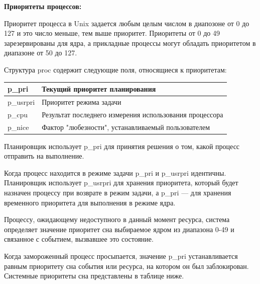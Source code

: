 \documentclass[14pt, a4paper]{extarticle}
\begin{document}
 	\textbf{Приоритеты процессов:}\par
 	Приоритет процесса в Unix задается любым целым числом в диапозоне от 0 до 127 и это число меньше,
 	тем выше приоритет. Приоритеты от 0 до 49 зарезервированы для ядра, а прикладные процессы могут обладать
 	приоритетом в диапазоне от 50 до 127.\par
 	Структура proc содержит следующие поля, относящиеся к приоритетам:
 	\begin{table}[h]
 		\begin{center}
 			\begin{tabular}{|l|l|}
 				\hline
 				p\_pri    & Текущий приоритет планирования                          \\ \hline
 				p\_usrpri & Приоритет режима задачи                                 \\ \hline
 				p\_cpu    & Результат последнего измерения использования процессора \\ \hline
 				p\_nice   & Фактор "любезности", устанавливаемый пользователем      \\ \hline
 			\end{tabular}
 		\end{center}
 	\end{table}\par
 
	 Планировщик использует p\_pri для принятия решения о том, какой процесс
	 отправить на выполнение.\par
	 Когда процесс находится в режиме задачи p\_pri и p\_usrpri идентичны.
	 Планировщик использует p\_usrpri для хранения приоритета, который будет
	 назначен процессу при возврате в режим задачи, а p\_pri — для хранения
	 временного приоритета для выполнения в режиме ядра.\par
	 Процессу, ожидающему недоступного в данный момент ресурса, система
	 определяет значение приоритет сна выбираемое ядром из диапазона 0-49 и
	 связанное с событием, вызвавшее это состояние.\par
	 Когда замороженный процесс просыпается, значение p\_pri устанавливается
	 равным приоритету сна события или ресурса, на котором он был заблокирован.
	 Системные приоритеты сна представлены в таблице ниже.
	 
\end{document}
